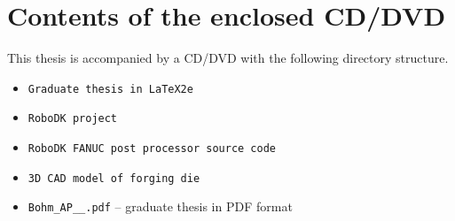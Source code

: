 ﻿\chapter{Contents of the enclosed CD/DVD \label{ch:ApendCD}}





This thesis is accompanied by a CD/DVD with the following directory structure.

\begin{itemize}
    \item \texttt{Graduate thesis in \LaTeX2e}\? 
        \textcolor{blue}{\em}
    \item \texttt{RoboDK project}\? 
        \textcolor{blue}{\em}
    \item \texttt{RoboDK FANUC post processor source code}\? 
        \textcolor{blue}{\em}
    \item \texttt{3D CAD model of forging die}\? 
        \textcolor{blue}{\em}
    \item \texttt{Bohm\_AP\_\the\value{YearOld}\_\Year.pdf} -- graduate thesis in PDF format
\end{itemize}






